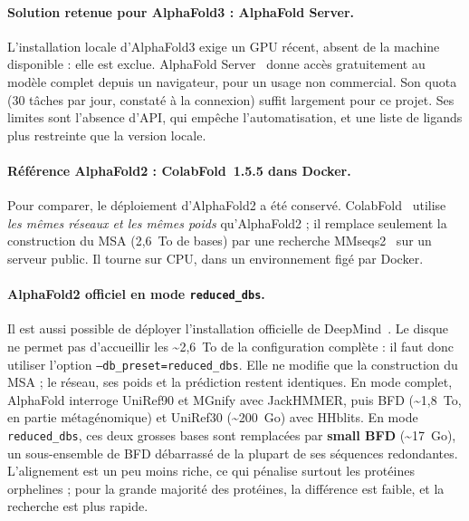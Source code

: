 \paragraph{Solution retenue pour AlphaFold3 : AlphaFold Server.} L'installation locale d'AlphaFold3 exige un GPU récent, absent de la machine disponible : elle est exclue. AlphaFold Server~\cite{alphafold_server} donne accès gratuitement au modèle complet depuis un navigateur, pour un usage non commercial. Son quota (30 tâches par jour, constaté à la connexion) suffit largement pour ce projet. Ses limites sont l'absence d'API, qui empêche l'automatisation, et une liste de ligands plus restreinte que la version locale.

\paragraph{Référence AlphaFold2 : ColabFold~1.5.5 dans Docker.} Pour comparer, le déploiement d'AlphaFold2 a été conservé. ColabFold~\cite{mirdita2022} utilise \emph{les mêmes réseaux et les mêmes poids} qu'AlphaFold2 ; il remplace seulement la construction du MSA (2,6~To de bases) par une recherche MMseqs2~\cite{steinegger2017} sur un serveur public. Il tourne sur CPU, dans un environnement figé par Docker.

\paragraph{AlphaFold2 officiel en mode \texttt{reduced\_dbs}.} Il est aussi possible de déployer l'installation officielle de DeepMind~\cite{alphafold_github}. Le disque ne permet pas d'accueillir les \textasciitilde 2,6~To de la configuration complète : il faut donc utiliser l'option \texttt{--db\_preset=reduced\_dbs}. Elle ne modifie que la construction du MSA ; le réseau, ses poids et la prédiction restent identiques. En mode complet, AlphaFold interroge UniRef90 et MGnify avec JackHMMER, puis BFD (\textasciitilde 1,8~To, en partie métagénomique) et UniRef30 (\textasciitilde 200~Go) avec HHblits. En mode \texttt{reduced\_dbs}, ces deux grosses bases sont remplacées par \textbf{small BFD} (\textasciitilde 17~Go), un sous-ensemble de BFD débarrassé de la plupart de ses séquences redondantes. L'alignement est un peu moins riche, ce qui pénalise surtout les protéines \og orphelines \fg{} ; pour la grande majorité des protéines, la différence est faible, et la recherche est plus rapide.

